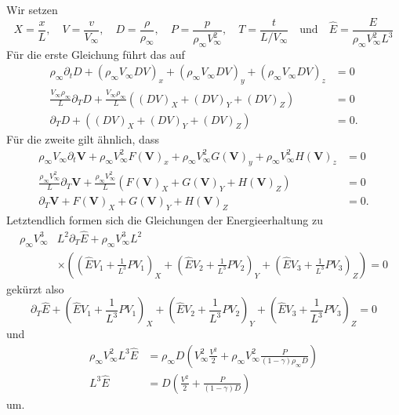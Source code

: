 \documentclass[12pt]{exam}
\newcommand{\del}{\partial}
\begin{document}
\begin{questions}
    \begin{solution}
        Wir setzen
        \begin{equation*}
            X = \frac{x}{L}, \quad V = \frac{v}{V_{\infty}}, \quad D = \frac{\rho}{\rho_{\infty}}, \quad P = \frac{p}{\rho_{\infty} V_{\infty}^2}, \quad T = \frac{t}{L/V_{\infty}} \quad \text{und} \quad \widehat{E} = \frac{E}{\rho_{\infty} V_{\infty}^2 L^3} 
        \end{equation*}
        Für die erste Gleichung führt das auf
        \begin{align*}
            \rho_{\infty} \del_t D + (\rho_{\infty} V_{\infty} DV)_x + (\rho_{\infty} V_{\infty} DV)_y + (\rho_{\infty} V_{\infty} DV)_z &= 0 \\
            \frac{V_{\infty} \rho_{\infty}}{L} \del_T D + \frac{V_{\infty} \rho_{\infty}}{L} \left( (DV)_X + (DV)_Y + (DV)_Z \right) &= 0 \\
            \del_T D + \left( (DV)_X + (DV)_Y + (DV)_Z \right) &= 0.
        \end{align*}
        Für die zweite gilt ähnlich, dass
        \begin{align*}
            \rho_{\infty} V_{\infty} \del_t \mathbf{V} + \rho_{\infty} V_{\infty}^2 F(\mathbf{V})_x + \rho_{\infty} V_{\infty}^2 G(\mathbf{V})_y + \rho_{\infty} V_{\infty}^2 H(\mathbf{V})_z &= 0 \\
            \frac{\rho_{\infty} V_{\infty}^2}{L} \del_T \mathbf{V} + \frac{\rho_{\infty} V_{\infty}^2}{L} \left( F(\mathbf{V})_X + G(\mathbf{V})_Y + H(\mathbf{V})_Z \right) &= 0 \\
            \del_T \mathbf{V} + F(\mathbf{V})_X + G(\mathbf{V})_Y + H(\mathbf{V})_Z &= 0.
        \end{align*}
        Letztendlich formen sich die Gleichungen der Energieerhaltung zu
        \begin{align*}
            \rho_{\infty} V_{\infty}^3 &L^2 \del_T \widehat{E} + \rho_{\infty} V_{\infty}^3 L^2 \\
            &\times \left( \left( \widehat{E}V_1 + \frac{1}{L^3} PV_1 \right)_X + \left( \widehat{E}V_2 + \frac{1}{L^3} PV_2 \right)_Y + \left( \widehat{E}V_3 + \frac{1}{L^3} PV_3 \right)_Z \right) = 0
        \end{align*}
        gekürzt also
        \begin{equation*}
            \del_T \widehat{E} + \left( \widehat{E}V_1 + \frac{1}{L^3} PV_1 \right)_X + \left( \widehat{E}V_2 + \frac{1}{L^3} PV_2 \right)_Y + \left(\widehat{E}V_3 + \frac{1}{L^3} PV_3 \right)_Z = 0
        \end{equation*}
        und
        \begin{align*}
            \rho_{\infty} V_{\infty}^2 L^3 \widehat{E} &= \rho_{\infty} D \left( V_{\infty}^2 \frac{V^2}{2} + \rho_{\infty} V_{\infty}^2 \frac{P}{(1-\gamma) \rho_{\infty} D} \right) \\
            L^3 \widehat{E} &= D \left( \frac{V^2}{2} + \frac{P}{(1-\gamma)D} \right)
        \end{align*}
        um.
        

\end{solution}
\end{questions}
\end{document}
